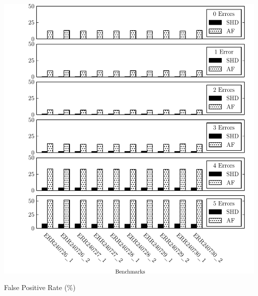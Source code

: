 \documentclass[12pt]{standalone}
\begin{document}
\large
\pagestyle{empty}
\begin{minipage}{19cm}
\noindent
\includegraphics[angle=-90]{combine_fig.pdf}\break
\vspace{-16.75cm}
\begin{center} \small False Positive Rate (\%) \end{center}
\vspace{15.5cm}
\end{minipage}
\end{document}
